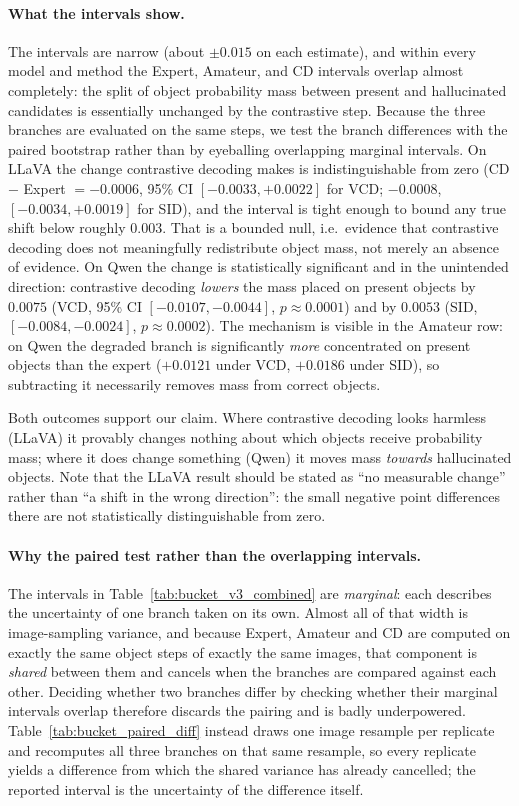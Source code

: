 \paragraph{What the intervals show.} The intervals are narrow (about $\pm 0.015$
on each estimate), and within every model and method the Expert, Amateur, and CD
intervals overlap almost completely: the split of object probability mass between
present and hallucinated candidates is essentially unchanged by the contrastive
step. Because the three branches are evaluated on the same steps, we test the
branch differences with the paired bootstrap rather than by eyeballing overlapping
marginal intervals. On LLaVA the change contrastive decoding makes is
indistinguishable from zero (CD $-$ Expert $= -0.0006$, 95\% CI
$[-0.0033, +0.0022]$ for VCD; $-0.0008$, $[-0.0034, +0.0019]$ for SID), and the
interval is tight enough to bound any true shift below roughly $0.003$. That is a
bounded null, i.e.\ evidence that contrastive decoding does not meaningfully
redistribute object mass, not merely an absence of evidence. On Qwen the change is
statistically significant and in the unintended direction: contrastive decoding
\emph{lowers} the mass placed on present objects by $0.0075$ (VCD, 95\% CI
$[-0.0107, -0.0044]$, $p \approx 0.0001$) and by $0.0053$ (SID,
$[-0.0084, -0.0024]$, $p \approx 0.0002$). The mechanism is visible in the
Amateur row: on Qwen the degraded branch is significantly \emph{more}
concentrated on present objects than the expert ($+0.0121$ under VCD, $+0.0186$
under SID), so subtracting it necessarily removes mass from correct objects.

Both outcomes support our claim. Where contrastive decoding looks harmless
(LLaVA) it provably changes nothing about which objects receive probability mass;
where it does change something (Qwen) it moves mass \emph{towards} hallucinated
objects. Note that the LLaVA result should be stated as ``no measurable change''
rather than ``a shift in the wrong direction'': the small negative point
differences there are not statistically distinguishable from zero.

\paragraph{Why the paired test rather than the overlapping intervals.} The
intervals in Table~\ref{tab:bucket_v3_combined} are \emph{marginal}: each
describes the uncertainty of one branch taken on its own. Almost all of that
width is image-sampling variance, and because Expert, Amateur and CD are computed
on exactly the same object steps of exactly the same images, that component is
\emph{shared} between them and cancels when the branches are compared against
each other. Deciding whether two branches differ by checking whether their
marginal intervals overlap therefore discards the pairing and is badly
underpowered. Table~\ref{tab:bucket_paired_diff} instead draws one image resample
per replicate and recomputes all three branches on that same resample, so every
replicate yields a difference from which the shared variance has already
cancelled; the reported interval is the uncertainty of the difference itself.

